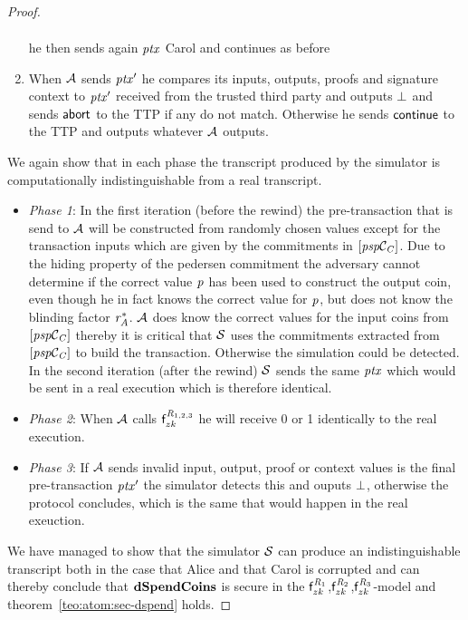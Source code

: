\begin{proof}
\begin{enumerate}
\begin{gather*}
        \end{gather*}
        he then sends again $\mathit{ptx}$ Carol and continues as before
        \item When $\mathcal{A}$ sends ${\mathit{ptx}}'$ he compares its inputs, outputs, proofs and signature context to ${\mathit{ptx}}'$ received from the trusted third party and outputs $\bot$ and sends $\mathsf{abort}$ to the TTP if any do not match.
        Otherwise he sends $\mathsf{continue}$ to the TTP and outputs whatever $\mathcal{A}$ outputs.
    \end{enumerate}

    We again show that in each phase the transcript produced by the simulator is computationally indistinguishable from a real transcript.

    \begin{itemize}
        \item \textit{Phase 1}: In the first iteration (before the rewind) the pre-transaction that is send to $\mathcal{A}$ will be constructed from randomly chosen values except for the transaction inputs which are given by the commitments in $[\mathit{psp}\mathcal{C}_{\mathit{C}}]$.
        Due to the hiding property of the pedersen commitment the adversary cannot determine if the correct value $\mathit{p}$ has been used to construct the output coin, even though he in fact knows the correct value for $\mathit{p}$, but does not know the blinding factor $\mathit{r}_{\mathit{A}}^*$.
        $\mathcal{A}$ does know the correct values for the input coins from $[\mathit{psp}\mathcal{C}_{\mathit{C}}]$ thereby it is critical that $\mathcal{S}$ uses the commitments extracted from $[\mathit{psp}\mathcal{C}_{\mathit{C}}]$ to build the transaction.
        Otherwise the simulation could be detected.
        In the second iteration (after the rewind) $\mathcal{S}$ sends the same $\mathit{ptx}$ which would be sent in a real execution which is therefore identical.
        \item \textit{Phase 2}: When $\mathcal{A}$ calls $\mathsf{f}^{\mathit{R}_{1,2,3}}_{zk}$ he will receive 0 or 1 identically to the real execution.
        \item \textit{Phase 3}: If $\mathcal{A}$ sends invalid input, output, proof or context values is the final pre-transaction ${\mathit{ptx}}'$ the simulator detects this and ouputs $\bot$, otherwise the protocol concludes, which is the same that would happen in the real exeuction.
    \end{itemize}

    We have managed to show that the simulator $\mathcal{S}$ can produce an indistinguishable transcript both in the case that Alice and that Carol is corrupted and can thereby conclude that $\mathbf{dSpendCoins}$ is secure in the $\mathsf{f}^{\mathit{R}_1}_{zk}$,$\mathsf{f}^{\mathit{R}_2}_{zk}$,$\mathsf{f}^{\mathit{R}_3}_{zk}$-model and theorem~\ref{teo:atom:sec-dspend} holds.
\end{proof}

